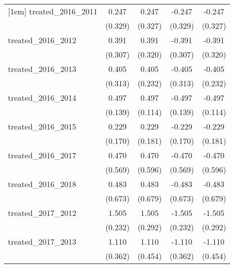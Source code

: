 {\begin{tabular}{l*{4}{c}}
[1em]
treated\_2016\_2011&       0.247         &       0.247         &      -0.247         &      -0.247         \\
            &     (0.329)         &     (0.327)         &     (0.329)         &     (0.327)         \\
[1em]
treated\_2016\_2012&       0.391         &       0.391         &      -0.391         &      -0.391         \\
            &     (0.307)         &     (0.320)         &     (0.307)         &     (0.320)         \\
[1em]
treated\_2016\_2013&       0.405         &       0.405         &      -0.405         &      -0.405         \\
            &     (0.313)         &     (0.232)         &     (0.313)         &     (0.232)         \\
[1em]
treated\_2016\_2014&       0.497\sym{***}&       0.497\sym{***}&      -0.497\sym{***}&      -0.497\sym{***}\\
            &     (0.139)         &     (0.114)         &     (0.139)         &     (0.114)         \\
[1em]
treated\_2016\_2015&       0.229         &       0.229         &      -0.229         &      -0.229         \\
            &     (0.170)         &     (0.181)         &     (0.170)         &     (0.181)         \\
[1em]
treated\_2016\_2017&       0.470         &       0.470         &      -0.470         &      -0.470         \\
            &     (0.569)         &     (0.596)         &     (0.569)         &     (0.596)         \\
[1em]
treated\_2016\_2018&       0.483         &       0.483         &      -0.483         &      -0.483         \\
            &     (0.673)         &     (0.679)         &     (0.673)         &     (0.679)         \\
[1em]
treated\_2017\_2012&       1.505\sym{***}&       1.505\sym{***}&      -1.505\sym{***}&      -1.505\sym{***}\\
            &     (0.232)         &     (0.292)         &     (0.232)         &     (0.292)         \\
[1em]
treated\_2017\_2013&       1.110\sym{**} &       1.110\sym{*}  &      -1.110\sym{**} &      -1.110\sym{*}  \\
            &     (0.362)         &     (0.454)         &     (0.362)         &     (0.454)         \\

\end{tabular}}
